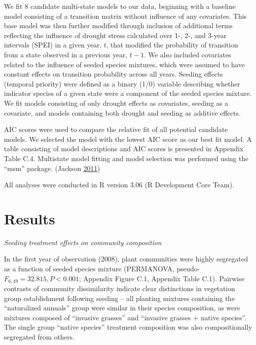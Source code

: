 \documentclass[twoside,12pt,final]{ucthesis-CA2012}
\begin{document}
\begin{ucmainmatter}
We fit 8 candidate multi-state models to our data, beginning with a baseline model consisting of a transition matrix without influence of any covariates.
This base model was then further modified through inclusion of additional terms reflecting the influence of drought stress calculated over 1-, 2-, and 3-year intervals (SPEI) in a given year, \(t\), that modified the probability of transition from a state observed in a previous year, \(t-1\). We also included covariates related to the influence of seeded species mixtures, which were assumed to have constant effects on transition probability across all years.
Seeding effects (temporal priority) were defined as a binary (1/0) variable describing whether indicator species of a given state were a component of the seeded species mixture.
We fit models consisting of only drought effects as covariates, seeding as a covariate, and models containing both drought and seeding as additive effects.

AIC scores were used to compare the relative fit of all potential candidate models. We selected the model with the lowest AIC score as our best fit model.
A table consisting of model descriptions and AIC scores is presented in Appendix Table C.4. Multistate model fitting and model selection was performed using the ``msm'' package. (Jackson \protect\hyperlink{ref-Jackson2011}{2011})

All analyses were conducted in R version 3.06 (R Development Core Team).

\hypertarget{results}{%
\section{Results}\label{results}}

\emph{Seeding treatment effects on community composition}

In the first year of observation (2008), plant communities were highly segregated as a function of seeded species mixture (PERMANOVA, pseudo-\(F_{6, 49} = 32.815, P < 0.001\); Appendix Figure C.1, Appendix Table C.1).
Pairwise contrasts of community dissimilarity indicate clear distinctions in vegetation group establishment following seeding -- all planting mixtures containing the ``naturalized annuals'' group were similar in their species composition, as were mixtures composed of ``invasive grasses'' and ``invasive grasses + native species''.
The single group ``native species'' treatment composition was also compositionally segregated from others.

~


\end{ucmainmatter}
\end{document}
